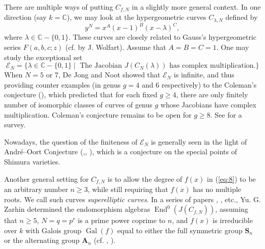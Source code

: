 \documentclass{amsart}[11pt]
\theoremstyle{definition}
\numberwithin{equation}{section}
\theoremstyle{notitle}
\begin{document}
There are multiple ways of putting $C_{f,N}$ in a slightly more
general context. In one direction (say $k={\mathbb{C}}$), we may look at the
hypergeometric curves $C_{\lambda, N}$ defined by
\begin{equation}
  \label{eq:hypergeometric_curve}
 y^N=x^A(x-1)^B (x-\lambda)^C,   
\end{equation}
 where $\lambda\in {\mathbb{C}}-\{0,
1\}$. These curves are closely related to Gauss's hypergeometric
series $F(a,b,c; z)$ (cf. \cite{MR931211} by J. Wolfart).  Assume that
$A=B=C=1$. One may study the exceptional set
\[\mathscr{E}_N=\{ \lambda \in {\mathbb{C}}-\{0,1\}\mid \text{ The Jacobian } J(C_N(\lambda)) \text{ has
  complex multiplication.}\}\] When $N=5$ or $7$, De Jong and Noot
\cite{MR1085259} showed that $\mathscr{E}_N$ is infinite, and thus providing
counter examples (in genus $g=4$ and $6$ respectively) to the
Coleman's conjecture (\cite[Conjecture 6]{MR948246}), which predicted
that for each fixed $g\geq 4$, there are only finitely number of
isomorphic classes of curves of genus $g$ whose Jacobians have complex
multiplication.  Coleman's conjecture remains to be open for $g\geq
8$. See \cite{MoonenOort} for a survey.
  
  
 Nowadays, the question of the finiteness of $\mathscr{E}_N$ is
generally seen in the light of Andr\'e--Oort Conjecture (\cite[p.~215,
problem 1]{MR990016},\cite{MR1472499}, \cite[Conjecture
1.5]{MR2166087}), which is a conjecture on the special points of
Shimura varieties.

Another general setting for $C_{f,N}$ is to allow the degree of $f(x)$
in (\ref{eq:8}) to be an arbitrary number $n\geq 3$, while still
requiring that $f(x)$ has no multiple roots.  We call such curves
\textit{superelliptic curves}. In a series of papers \cite{MR2166091},
\cite{MR2471095}, etc., Yu. G. Zarhin determined the endomorphism
algebras $\operatorname{End}^0(J(C_{f,N}))$, assuming that $n\geq 5$, $N=q=p^r$ is a
prime power coprime to $n$, and $f(x)$ is irreducible over $k$ with
Galois group $\operatorname{Gal}(f)$ equal to either the full symmetric group ${{\mathbf S}_n}$
or the alternating group ${{\mathbf A}_n}$ (cf. \cite[Theorem 1.1]{MR2166091},
\cite[Theorem 1.1]{MR2471095}).
\end{document}
